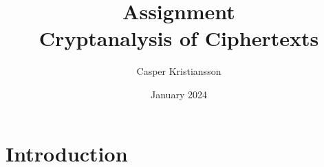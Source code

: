 \documentclass{article}
\title{Assignment \\ Cryptanalysis of Ciphertexts}
\author{Casper Kristiansson}
\date{January 2024}
\begin{document}
\maketitle

\section{Introduction}




\newpage


\end{document}
